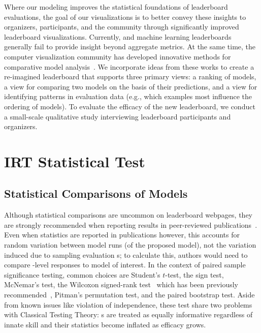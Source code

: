 Where our modeling improves the statistical foundations of leaderboard evaluations, the goal of our visualizations is to better convey these insights to organizers, participants, and the \nlp{} community through significantly improved leaderboard visualizations.
Currently, \nlp{} and machine learning leaderboards generally fail to provide insight beyond aggregate metrics.
At the same time, the computer visualization community has developed innovative methods for comparative model analysis~\citep{zhang2019manifold}.
We incorporate ideas from these works to create a re-imagined leaderboard that supports three primary views: a ranking of models, a view for comparing two models on the basis of their predictions, and a view for identifying patterns in evaluation data (e.g., which examples most influence the ordering of models).
To evaluate the efficacy of the new leaderboard, we conduct a small-scale qualitative study interviewing leaderboard participants and organizers.


\section{IRT Statistical Test}
\label{ch:isicle:apx:irt-test}

\subsection{Statistical Comparisons of Models}
\label{ch:isicle:stats}

Although statistical comparisons are uncommon on leaderboard webpages, they are strongly recommended when reporting results in peer-reviewed publications~\citep{dror2018guide}.
Even when statistics are reported in publications however, this  accounts for random variation between model runs (of the proposed model), not the variation induced due to sampling evaluation \itm{}s; to calculate this, authors would need to compare \itm{}-level responses to  model of interest.
In the context of paired sample significance testing, common choices are Student's $t$-test, the sign test, McNemar's test, the Wilcoxon signed-rank test~\citep{wilcoxon1945test} which has been previously recommended~\citep{demsar2006stats}, Pitman's permutation test, and the paired bootstrap test.
Aside from known issues like violation of \itm{} independence, these test share two problems with Classical Testing Theory: \itm{}s are treated as equally informative regardless of \subj{} innate skill and their statistics become inflated as \subj{} efficacy grows.

